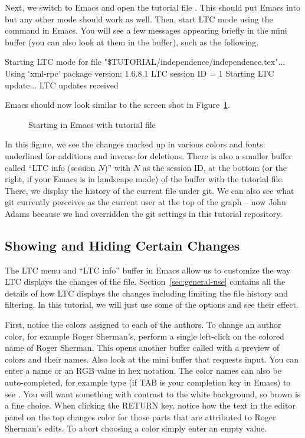Next, we switch to Emacs and open the tutorial file .  This should put Emacs into  but any other mode should work as well.  Then, start LTC mode using the command  in Emacs.  You will see a few messages appearing briefly in the mini buffer (you can also look at them in the  buffer), such as the following.
\begin{FileVerbatim}
Starting LTC mode for file "\$TUTORIAL/independence/independence.tex"...
Using `xml-rpc' package version: 1.6.8.1
LTC session ID = 1
Starting LTC update...
LTC updates received
\end{FileVerbatim}
Emacs should now look similar to the screen shot in Figure~\ref{fig:emacs-open}.
\begin{figure}[t]
\centering
{}
\caption{Starting  in Emacs with tutorial file} \label{fig:emacs-open}
\end{figure}
In this figure, we see the changes marked up in various colors and fonts: underlined for additions and inverse for deletions.  There is also a smaller buffer called ``LTC info (session $N$)'' with $N$ as the session ID, at the bottom (or the right, if your Emacs is in landscape mode) of the buffer with the tutorial file.  There, we display the history of the current file under git.  We can also see what git currently perceives as the current user at the top of the graph -- now John Adams because we had overridden the git settings in this tutorial repository.

\subsection{Showing and Hiding Certain Changes}

The LTC menu and ``LTC info'' buffer in Emacs allow us to customize the way LTC displays the changes of the file.  Section~\ref{sec:general-use} contains all the details of how LTC displays the changes including limiting the file history and filtering.  In this tutorial, we will just use some of the options and see their effect.

First, notice the colors assigned to each of the authors.  To change an author color, for example Roger Sherman's,  perform a single left-click on the colored name of Roger Sherman.  This opens another buffer called  with a preview of colors and their names.  Also look at the mini buffer that requests input.   You can enter a name or an RGB value in hex notation.  The color names can also be auto-completed, for example type  (if TAB is your completion key in Emacs) to see .  You will want something with contrast to the white background, so brown is a fine choice.  When clicking the RETURN key, notice how the text in the editor panel on the top changes color for those parts that are attributed to Roger Sherman's edits.  To abort choosing a color simply enter an empty value.

